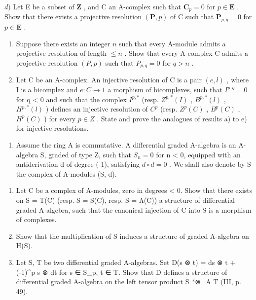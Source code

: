 \(d)\) Let E be a subset of \(\mathbf{Z}\) , and C an A-complex such that \(\mathbf{C}_{p}=0\) for \(p\in\mathbf{E}\) . Show that there exists a projective resolution \((\mathbf{P},p)\) of C such that \(\mathbf{P}_{p,q}=0\) for \(p\in\mathbf{E}\) .

\begin{enumerate}
\def\labelenumi{\alph{enumi})}
\setcounter{enumi}{4}
\item
  Suppose there exists an integer \(n\) such that every A-module admits a projective resolution of length \(\leqslant n\) . Show that every A-complex C admits a projective resolution \((P, p)\) such that \(P_{p,q} = 0\) for \(q > n\) .
\item
  Let C be an A-complex. An injective resolution of C is a pair \((e, l)\) , where I is a bicomplex and \(e: C \to 1\) a morphism of bicomplexes, such that \(I^{p,q} = 0\) for q \textless{} 0 and such that the complex \(I^{p,*}\) (resp. \(Z^{p,*}(I)\) , \(B^{p,*}(l)\) , \(H^{p,*}(l)\) ) defines an injective resolution of \(C^{p}\) (resp. \(Z^{p}(C)\) , \(B^{p}(C)\) , \(H^{p}(C)\) ) for every \(p \in Z\) . State and prove the analogues of results a) to e) for injective resolutions.
\end{enumerate}

\begin{enumerate}
\def\labelenumi{\arabic{enumi})}
\setcounter{enumi}{17}
\tightlist
\item
  Assume the ring A is commutative. A differential graded A-algebra is an A-algebra S, graded of type Z, such that \(S_{n} = 0\) for n \textless{} 0, equipped with an antiderivation d of degree (-1), satisfying \(d \circ d = 0\) . We shall also denote by S the complex of A-modules (S, d).
\end{enumerate}

\begin{enumerate}
\def\labelenumi{\alph{enumi})}
\item
  Let C be a complex of A-modules, zero in degrees \textless{} 0. Show that there exists on S = T(C) (resp. S = S(C), resp. S = Λ(C)) a structure of differential graded A-algebra, such that the canonical injection of C into S is a morphism of complexes.
\item
  Show that the multiplication of S induces a structure of graded A-algebra on H(S).
\item
  Let S, T be two differential graded A-algebras. Set D(s ⊗ t) = ds ⊗ t + (-1)\^{}p s ⊗ dt for s ∈ S\_p, t ∈ T. Show that D defines a structure of differential graded A-algebra on the left tensor product S *⊗\_A T (III, p. 49).
\end{enumerate}

